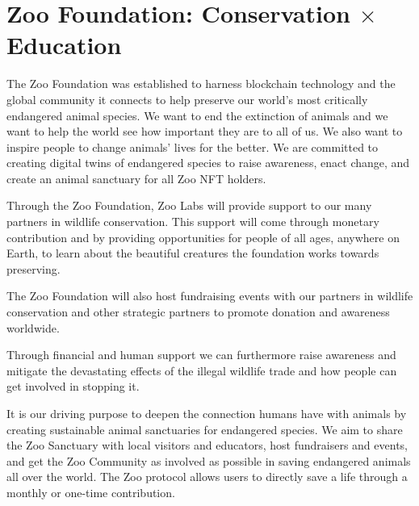 \section{Zoo Foundation: Conservation $\times$ Education}

The Zoo Foundation was established to harness blockchain technology and the global community it connects to help preserve our world's most critically endangered animal species. We want to end the extinction of animals and we want to help the world see how important they are to all of us. We also want to inspire people to change animals' lives for the better. We are committed to creating digital twins of endangered species to raise awareness, enact change, and create an animal sanctuary for all Zoo NFT holders.

Through the Zoo Foundation, Zoo Labs will provide support to our many partners in wildlife conservation. This support will come through monetary contribution and by providing opportunities for people of all ages, anywhere on Earth, to learn about the beautiful creatures the foundation works towards preserving.

The Zoo Foundation will also host fundraising events with our partners in wildlife conservation and other strategic partners to promote donation and awareness worldwide.

Through financial and human support we can furthermore raise awareness and mitigate the devastating effects of the illegal wildlife trade and how people can get involved in stopping it.

It is our driving purpose to deepen the connection humans have with animals by creating sustainable animal sanctuaries for endangered species. We aim to share the Zoo Sanctuary with local visitors and educators, host fundraisers and events, and get the Zoo Community as involved as possible in saving endangered animals all over the world. The Zoo protocol allows users to directly save a life through a monthly or one-time contribution.
